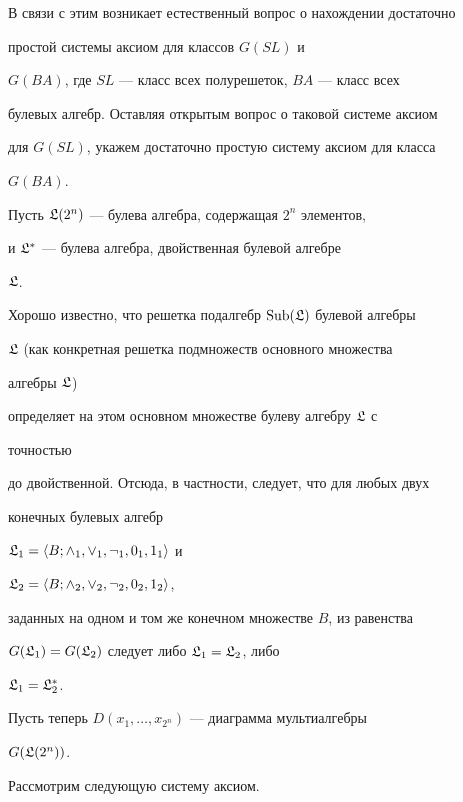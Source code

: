  


В связи с этим возникает естественный вопрос о нахождении достаточно 


простой системы аксиом для классов $G(SL)$ и 


$G(BA)$, где $SL$ --- класс всех полурешеток, $BA$ --- класс всех 


булевых алгебр. Оставляя открытым вопрос о таковой системе аксиом


для $G(SL)$, укажем достаточно простую систему аксиом для класса 


$G(BA)$. 


 


Пусть $\frak L(2^n)$ --- булева алгебра, содержащая $2^n$ элементов, 


и $\frak L^*$ --- булева алгебра, двойственная булевой алгебре 


$\frak L$. 


Хорошо известно, что решетка подалгебр $\operatorname{Sub}(\frak L)$ булевой алгебры 


$\frak L$ (как конкретная решетка подмножеств основного множества 


алгебры $\frak L$) 


определяет на этом основном множестве булеву алгебру $\frak L$ с 


точностью 


до двойственной. Отсюда, в частности, следует, что для любых двух 


конечных булевых алгебр 


$\frak L_1=\langle B;\wedge_1,\vee_1,\neg_1,0_1,1_1\rangle$ и 


$\frak L_2=\langle B;\wedge_2,\vee_2,\neg_2,0_2,1_2\rangle$, 


заданных на одном и том же конечном множестве $B$, из равенства 


$G(\frak L_1)=G(\frak L_2)$ следует либо $\frak L_1=\frak L_2$, либо 


$\frak L_1=\frak L^*_2$. 


Пусть теперь $D(x_1,\dotsc,x_{2^n})$ --- диаграмма мультиалгебры 


$G(\frak L(2^n))$. 


Рассмотрим следующую систему аксиом. 


